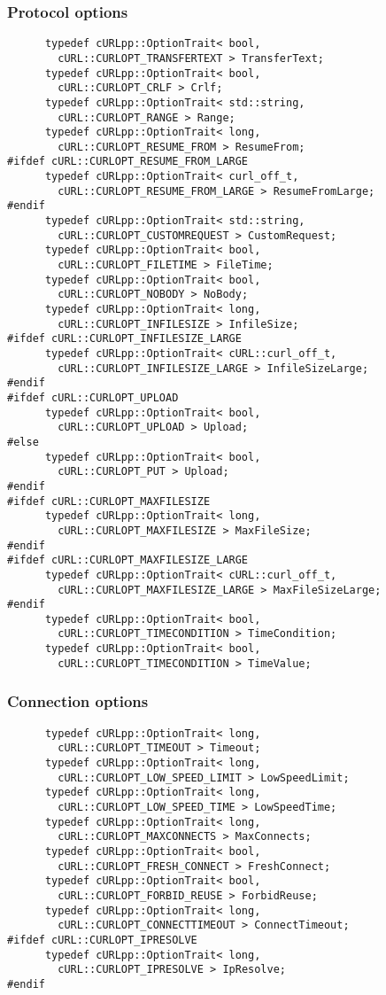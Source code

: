 \documentclass{article}
\begin{document}
\subsubsection{Protocol options}
\begin{verbatim}
      typedef cURLpp::OptionTrait< bool, 
        cURL::CURLOPT_TRANSFERTEXT > TransferText;
      typedef cURLpp::OptionTrait< bool, 
        cURL::CURLOPT_CRLF > Crlf;
      typedef cURLpp::OptionTrait< std::string, 
        cURL::CURLOPT_RANGE > Range;
      typedef cURLpp::OptionTrait< long, 
        cURL::CURLOPT_RESUME_FROM > ResumeFrom;
#ifdef cURL::CURLOPT_RESUME_FROM_LARGE
      typedef cURLpp::OptionTrait< curl_off_t, 
        cURL::CURLOPT_RESUME_FROM_LARGE > ResumeFromLarge;
#endif
      typedef cURLpp::OptionTrait< std::string, 
        cURL::CURLOPT_CUSTOMREQUEST > CustomRequest;
      typedef cURLpp::OptionTrait< bool, 
        cURL::CURLOPT_FILETIME > FileTime;
      typedef cURLpp::OptionTrait< bool, 
        cURL::CURLOPT_NOBODY > NoBody;
      typedef cURLpp::OptionTrait< long, 
        cURL::CURLOPT_INFILESIZE > InfileSize;
#ifdef cURL::CURLOPT_INFILESIZE_LARGE
      typedef cURLpp::OptionTrait< cURL::curl_off_t, 
        cURL::CURLOPT_INFILESIZE_LARGE > InfileSizeLarge;
#endif
#ifdef cURL::CURLOPT_UPLOAD
      typedef cURLpp::OptionTrait< bool, 
        cURL::CURLOPT_UPLOAD > Upload;
#else
      typedef cURLpp::OptionTrait< bool, 
        cURL::CURLOPT_PUT > Upload;
#endif
#ifdef cURL::CURLOPT_MAXFILESIZE
      typedef cURLpp::OptionTrait< long, 
        cURL::CURLOPT_MAXFILESIZE > MaxFileSize;
#endif
#ifdef cURL::CURLOPT_MAXFILESIZE_LARGE
      typedef cURLpp::OptionTrait< cURL::curl_off_t, 
        cURL::CURLOPT_MAXFILESIZE_LARGE > MaxFileSizeLarge;
#endif
      typedef cURLpp::OptionTrait< bool, 
        cURL::CURLOPT_TIMECONDITION > TimeCondition;
      typedef cURLpp::OptionTrait< bool, 
        cURL::CURLOPT_TIMECONDITION > TimeValue;
\end{verbatim}

\subsubsection{Connection options}
\begin{verbatim}       
      typedef cURLpp::OptionTrait< long, 
        cURL::CURLOPT_TIMEOUT > Timeout;
      typedef cURLpp::OptionTrait< long, 
        cURL::CURLOPT_LOW_SPEED_LIMIT > LowSpeedLimit;
      typedef cURLpp::OptionTrait< long, 
        cURL::CURLOPT_LOW_SPEED_TIME > LowSpeedTime;
      typedef cURLpp::OptionTrait< long, 
        cURL::CURLOPT_MAXCONNECTS > MaxConnects;
      typedef cURLpp::OptionTrait< bool, 
        cURL::CURLOPT_FRESH_CONNECT > FreshConnect;
      typedef cURLpp::OptionTrait< bool, 
        cURL::CURLOPT_FORBID_REUSE > ForbidReuse;
      typedef cURLpp::OptionTrait< long, 
        cURL::CURLOPT_CONNECTTIMEOUT > ConnectTimeout;
#ifdef cURL::CURLOPT_IPRESOLVE
      typedef cURLpp::OptionTrait< long, 
        cURL::CURLOPT_IPRESOLVE > IpResolve;
#endif
\end{verbatim}
\end{document}
